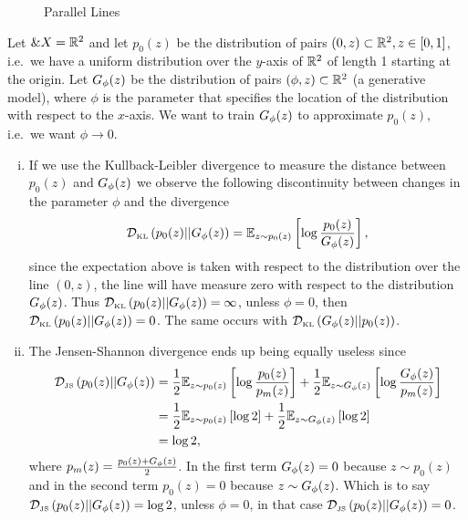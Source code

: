 \begin{example}
  \begin{figure}[h] \centering
    \caption{Parallel Lines}%
    \label{fig:parallel-lines}
  \end{figure}%
  \label{example:learning-parallel-lines}

  Let $\&X = \mathbb{R}^2$ and let $p_0(z)$ be the distribution of pairs
  $(0, z) \subset \mathbb{R}^2, z \in [0, 1]$, i.e.\ we have a uniform
  distribution over the $y$-axis of $\mathbb{R}^2$ of length 1 starting at the
  origin. Let $G_\phi(z)$ be the distribution of pairs
  $(\phi, z) \subset \mathbb{R}^2$ (a generative model), where $\phi$ is the
  parameter that specifies the location of the distribution with
  respect to the $x$-axis. We want to train $G_\phi(z)$ to approximate
  $p_0(z)$, i.e.\ we want $\phi \to 0$.
  \begin{enumerate}[(i)]
  \item If we use the Kullback-Leibler divergence to measure the
    distance between $p_0(z)$ and $G_\phi(z)$ we observe the following
    discontinuity between changes in the parameter $\phi$ and the
    divergence
    \begin{align}
      \mathcal{D}_{\text{\tiny KL}}\left( p_0(z) \middle| \middle| G_\phi(z) \right) = \mathbb{E}_{z \sim p_0(z)}\left[ \log{p_0(z)\over G_\phi(z)} \right],
    \end{align}
    since the expectation above is taken with respect to the
    distribution over the line $(0, z)$, the line will have measure
    zero with respect to the distribution $G_\phi(z)$. Thus
    $\mathcal{D}_{\text{\tiny KL}}\left( p_0(z) \middle| \middle| G_\phi(z) \right) = \infty$, unless $\phi = 0$, then
    $\mathcal{D}_{\text{\tiny KL}}\left( p_0(z) \middle| \middle| G_\phi(z) \right) = 0$. The same occurs with
    $\mathcal{D}_{\text{\tiny KL}}\left( G_\phi(z) \middle| \middle| p_0(z) \right)$.
  \item The Jensen-Shannon divergence ends up being equally useless
    since
    \begin{align}
      \mathcal{D}_{\text{\tiny JS}}\left(p_0(z)\middle|\middle|G_\phi(z)\right) & = {1 \over 2} \mathbb{E}_{z \sim p_0(z)}\left[ \log{p_0(z)
                            \over p_m(z)} \right] + {1 \over 2} \mathbb{E}_{z \sim
                            G_\phi(z)}\left[ \log{G_\phi(z) \over p_m(z)} \right] \\
                          & = {1 \over 2} \mathbb{E}_{z \sim p_0(z)}\left[ \log{2} \right] + {1
                            \over 2} \mathbb{E}_{z \sim G_\phi(z)}\left[ \log{2} \right] \\
                          & = \log{2},
    \end{align}
    where $p_m(z) = {p_0(z) + G_\phi(z) \over 2}$. In the first term
    $G_\phi(z) = 0$ because $z \sim p_0(z)$ and in the second term
    $p_0(z) = 0$ because $z \sim G_\phi(z)$. Which is to say
    $\mathcal{D}_{\text{\tiny JS}}\left(p_0(z)\middle|\middle|G_\phi(z)\right) = \log{2}$, unless $\phi = 0$, in that case
    $\mathcal{D}_{\text{\tiny JS}}\left(p_0(z)\middle|\middle|G_\phi(z)\right) = 0$.
  \end{enumerate}
\end{example}

